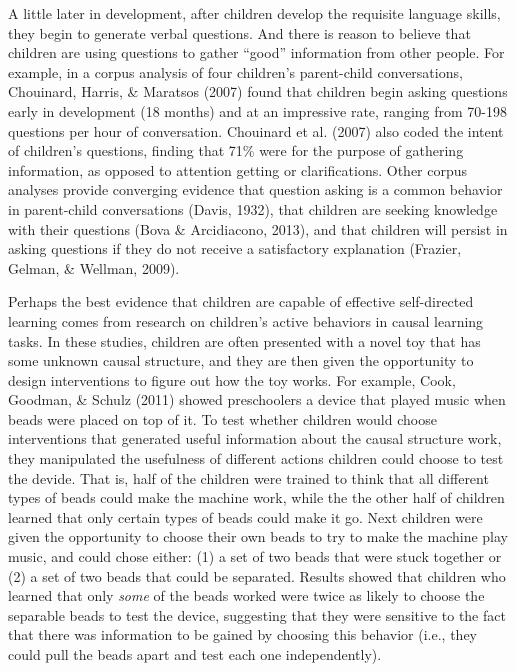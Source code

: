 \documentclass[a4paper,man,apacite,floatsintext]{apa6}
\begin{document}
A little later in development, after children develop the requisite
language skills, they begin to generate verbal questions. And there is
reason to believe that children are using questions to gather ``good''
information from other people. For example, in a corpus analysis of four
children's parent-child conversations, Chouinard, Harris, \& Maratsos
(2007) found that children begin asking questions early in development
(18 months) and at an impressive rate, ranging from 70-198 questions per
hour of conversation. Chouinard et al. (2007) also coded the intent of
children's questions, finding that 71\% were for the purpose of
gathering information, as opposed to attention getting or
clarifications. Other corpus analyses provide converging evidence that
question asking is a common behavior in parent-child conversations
(Davis, 1932), that children are seeking knowledge with their questions
(Bova \& Arcidiacono, 2013), and that children will persist in asking
questions if they do not receive a satisfactory explanation (Frazier,
Gelman, \& Wellman, 2009).

Perhaps the best evidence that children are capable of effective
self-directed learning comes from research on children's active
behaviors in causal learning tasks. In these studies, children are often
presented with a novel toy that has some unknown causal structure, and
they are then given the opportunity to design interventions to figure
out how the toy works. For example, Cook, Goodman, \& Schulz (2011)
showed preschoolers a device that played music when beads were placed on
top of it. To test whether children would choose interventions that
generated useful information about the causal structure work, they
manipulated the usefulness of different actions children could choose to
test the devide. That is, half of the children were trained to think
that all different types of beads could make the machine work, while the
the other half of children learned that only certain types of beads
could make it go. Next children were given the opportunity to choose
their own beads to try to make the machine play music, and could chose
either: (1) a set of two beads that were stuck together or (2) a set of
two beads that could be separated. Results showed that children who
learned that only \emph{some} of the beads worked were twice as likely
to choose the separable beads to test the device, suggesting that they
were sensitive to the fact that there was information to be gained by
choosing this behavior (i.e., they could pull the beads apart and test
each one independently).
\end{document}

